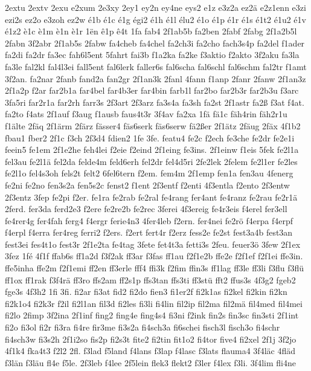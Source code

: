 {2extu
2extv
2exu
e2xum
2e3xy
2ey1
ey2n
ey4ne
eys2
e1z
e3z2a
ez2ä
e2z1enn
e3zi
ezi2s
ez2o
e3zoh
ez2w
é1b
é1c
é1g
égi2
é1h
é1l
élu2
é1o
é1p
é1r
é1s
é1t2
é1u2
é1v
é1z2
è1c
è1m
è1n
è1r
1ën
ê1p
ê4t
1fa
fab4
2f1ab5b
fa2ben
2fabf
2fabg
2f1a2b5l
2fabn
3f2abr
2f1ab5s
2fabw
fa4cheb
fa4chel
fa2ch3i
fa2cho
fach3s4p
fa2del
f1ader
fa2di
fa2dr
fa3ec
fah6l5ent
5fahrt
fai3b
f1a2ka
fa2ke
f3aktio
f2akto
3f2aku
fa3la
fa3le
fal2kl
fal4l3ei
fall5ent
fal6lerk
faller6s
fal6scha
fal6schl
fal6schm
fal2tr
f1amt
3f2an.
fa2nar
2fanb
fand2a
fan2gr
2f1an3k
2fanl
4fann
f1anp
2fanr
2fanw
2f1an3z
2f1a2p
f2ar
far2b1a
far4bel
far4b3er
far4bin
farb1l
far2bo
far2b3r
far2b3u
f3arc
3fa5ri
far2r1a
far2rh
farr3s
2f3art
2f3arz
fa3s4a
fa3sh
fa2st
2f1astr
fa2ß
f3at
f4at.
fa2to
f4ats
2f1auf
f3aug
f1ausb
faus4t3r
3f4av
fa2xa
1fä
fä1c
fäh4rin
fäh2r1u
f1älte
2fäq
2f1ärm
2färz
fässer4
fäs6serk
fäs6serw
fä2ßer
2f1ätz
2fäug
2fäx
4f1b2
fbau1
fber2
2f1c
f3ch
2f3d4
fdien2
1fe
3fe.
featu4
fe2c
f2ech
fe3che
fe2dr
fe2e1i
feein5
fe1em
2f1e2he
feh4lei
f2eie
f2eind
2f1eing
fe3ins.
2f1einw
f1eis
5fek
fe2l1a
fel3au
fe2l1ä
fel2da
felde4m
feld6erh
fel2dr
fel4d5ri
2fe2lek
2felem
fe2l1er
fe2les
fe2l1o
fel4s3oh
fels2t
felt2
6fel6tern
f2em.
fem4m
2f1emp
fen1a
fen3au
4fenerg
fe2ni
fe2no
fen3s2a
fen5s2c
fenst2
f1ent
2f3entf
f2enti
4f3entla
f2ento
2f3entw
2f3entz
3fep
fe2pi
f2er.
fe1ra
fe2rab
fe2ral
fe4rang
fer4ant
fe4ranz
fe2rau
fe2r1ä
2ferd.
fer3da
ferd2e3
f2ere
fe2re2b
fe2rec
3ferei
4f3ereig
fe4r3eis
f4erel
fer3ell
fe4rer4g
fer4fah
ferg4
f4ergr
ferie4n3
4fer4leb
f2ern.
fer4nei
fe2rö
f4erpa
f4erpf
f4erpl
f4erra
fer4reg
ferri2
f2ers.
f2ert
fert4r
f2erz
fess2e
fe2st
fest3a4b
fest3an
fest3ei
fes4t1o
fest3r
2f1e2ta
fe4tag
3fete
fet4t3a
fetti3s
2feu.
feuer3ö
3few
2f1ex
3fez
1fé
4f1f
ffab6s
ff1a2d
f3f2ak
ff3ar
f3fas
ff1au
f2f1e2b
ffe2e
f2f1ef
f2f1ei
ffe3in.
ffe5inha
ffe2m
f2f1emi
ff2en
ff3erle
fff4
ffi3k
f2fim
ffin3s
ff1lag
ff3le
ff3li
f3flu
f3flü
ff1ox
ff1rak
f3f4rä
ff3ro
ffs2am
ff2s1p
ffs3tan
ffs3ti
ff3stü
fft2
ffus3s
4f3g2
fgeb2
fge3s
4f3h2
1fi
3fi.
fi2ar
fi3at
fid2
fi2do
fien3
fi1er2f
fi2k1as
fi2kel
fi2kin
fi2kn
fi2k1o4
fi2k3r
f2il
fi2l1an
fil3d
fi2les
fi3li
fi4lin
fil2ip
fil2ma
fil2mä
fil4med
fil4mei
fi2lo
2fimp
3f2ina
2f1inf
fing2
fing4e
fing4s4
fi3ni
f2ink
fin2s
fin3sc
fin3sti
2f1int
fi2o
fi3ol
fi2r
fi3ra
fi4re
fir3me
fi3s2a
fi4sch3a
fi6schei
fisch3l
fisch3o
fi4schr
fi4sch3w
fi3s2h
2f1i2so
fis2p
fi2s3t
fite2
fi2tin
fit1o2
fi4tor
five4
fi2xel
2f1j
3f2jo
4f1k4
fka4t3
f2l2
2fl.
f3lad
f5land
f4lans
f3lap
f4lasc
f3lats
flauma4
3f4läc
4fläd
f3län
f3läu
fl4e
f5le.
2f3leb
f4lee
2f5lein
flek3
flekt2
f3ler
f4lex
f3li.
3f4lim
fli4ne
}
